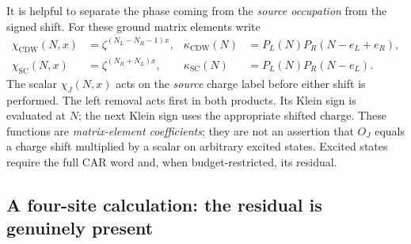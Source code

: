It is helpful to separate the phase coming from the \emph{source
occupation} from the signed shift.  For these ground matrix elements
write
\begin{align}
 \chi_{\mathrm{CDW}}(N,x)&=\zeta^{(N_L-N_R-1)x},
 &\kappa_{\mathrm{CDW}}(N)
   &=P_L(N)P_R(N-e_L+e_R),
 \label{eq:ch20-cdw-chi-kappa}\\
 \chi_{\mathrm{SC}}(N,x)&=\zeta^{(N_R+N_L)x},
 &\kappa_{\mathrm{SC}}(N)
   &=P_L(N)P_R(N-e_L).
 \label{eq:ch20-sc-chi-kappa}
\end{align}
The scalar \(\chi_J(N,x)\) acts on the \emph{source} charge label
before either shift is performed.  The left removal acts first in
both products.  Its Klein sign is evaluated at \(N\); the next
Klein sign uses the appropriate shifted charge.  These functions are
\emph{matrix-element coefficients}; they are not an assertion that
\(O_J\) equals a charge shift multiplied by a scalar on arbitrary
excited states.  Excited states require the full CAR word and, when
budget-restricted, its residual.

\subsection{A four-site calculation: the residual is genuinely present}
\label{subsec:ch20-four-site}

